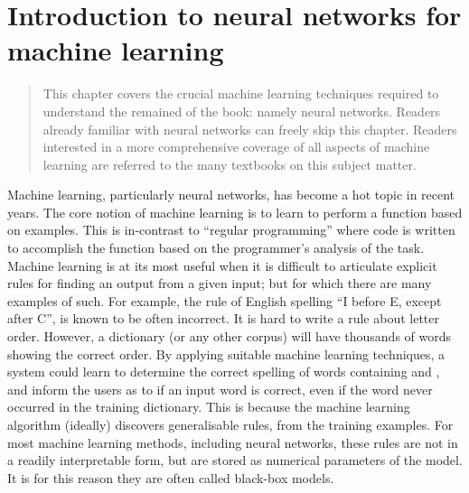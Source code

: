 \documentclass[12pt,parskip]{komatufte}
\begin{document}

\chapter{Introduction to neural networks for machine learning}\label{sec:machine-learning-for-representations}


\begin{abstract}
	This chapter covers the crucial machine learning techniques required to understand the remained of the book: namely neural networks.
	Readers already familiar with neural networks can freely skip this chapter.
	Readers interested in a more comprehensive coverage of all aspects of machine learning are referred to the many textbooks on this subject matter.
\end{abstract}

Machine learning, particularly neural networks, has become a hot topic in recent years.
The core notion of machine learning is to learn to perform a function based on examples.
This is in-contrast to ``regular programming'' where code is written to accomplish the function based on the programmer's analysis of the task.
Machine learning is at its most useful when it is difficult to articulate explicit rules for finding an output from a given input; but for which there are many examples of such.
For example, the rule of English spelling ``I before E, except after C'', is known to be often incorrect.
It is hard to write a rule about letter order.
However, a dictionary (or any other corpus) will have thousands of words showing the correct order.
By applying suitable machine learning techniques,
a system could learn to determine the correct spelling of words containing  and ,
and inform the users as to if an input word is correct, even if the word never occurred in the training dictionary.
This is because the machine learning algorithm (ideally) discovers generalisable rules, from the training examples.
For most machine learning methods, including neural networks, these rules are not in a readily interpretable form, but are stored as numerical parameters of the model.
It is for this reason they are often called black-box models.
\end{document}
